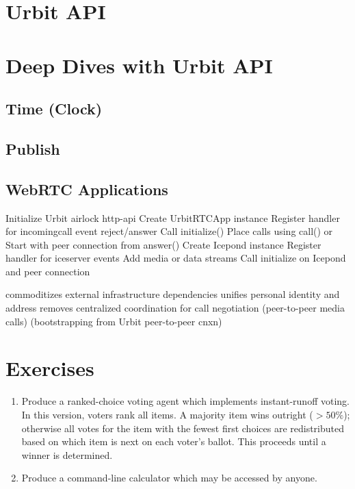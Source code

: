 \section{Urbit API}

\section{Deep Dives with Urbit API}

\subsection{Time (Clock)}

\subsection{Publish}

\subsection{\graphstore}

\subsection{WebRTC Applications}

Initialize Urbit airlock http-api
Create UrbitRTCApp instance
Register handler for incomingcall event
  reject/answer
Call initialize()
Place calls using call()
or Start with peer connection from answer()
Create Icepond instance
Register handler for iceserver events
Add media or data streams
Call initialize on Icepond and peer connection

commoditizes external infrastructure dependencies
unifies personal identity and address
removes centralized coordination for call negotiation (peer-to-peer media calls)
(bootstrapping from Urbit peer-to-peer cnxn)


\section{Exercises}

\begin{enumerate}
  \item  Produce a ranked-choice voting agent which implements instant-runoff voting.  In this version, voters rank all items.  A majority item wins outright ($>50\%$); otherwise all votes for the item with the fewest first choices are redistributed based on which item is next on each voter's ballot.  This proceeds until a winner is determined.
  \item  Produce a command-line calculator which may be accessed by anyone.
\end{enumerate}
